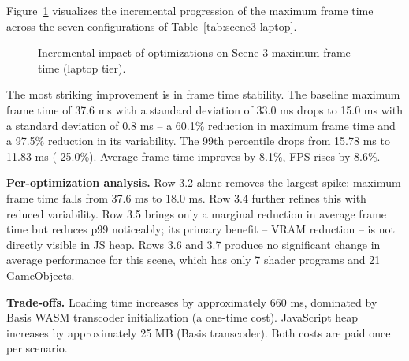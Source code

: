 Figure~\ref{fig:incremental} visualizes the incremental progression of the maximum frame time across the seven configurations of Table~\ref{tab:scene3-laptop}.

\begin{figure}[h]
\centering
{}
\caption{Incremental impact of optimizations on Scene 3 maximum frame time (laptop tier).}
\label{fig:incremental}
\end{figure}

The most striking improvement is in frame time stability. The baseline maximum frame time of 37.6 ms with a standard deviation of 33.0 ms drops to 15.0 ms with a standard deviation of 0.8 ms -- a 60.1\% reduction in maximum frame time and a 97.5\% reduction in its variability. The 99th percentile drops from 15.78 ms to 11.83 ms (-25.0\%). Average frame time improves by 8.1\%, FPS rises by 8.6\%.

\textbf{Per-optimization analysis.} Row 3.2 alone removes the largest spike: maximum frame time falls from 37.6 ms to 18.0 ms. Row 3.4 further refines this with reduced variability. Row 3.5 brings only a marginal reduction in average frame time but reduces p99 noticeably; its primary benefit -- VRAM reduction -- is not directly visible in JS heap. Rows 3.6 and 3.7 produce no significant change in average performance for this scene, which has only 7 shader programs and 21 GameObjects.

\textbf{Trade-offs.} Loading time increases by approximately 660 ms, dominated by Basis WASM transcoder initialization (a one-time cost). JavaScript heap increases by approximately 25 MB (Basis transcoder). Both costs are paid once per scenario.


